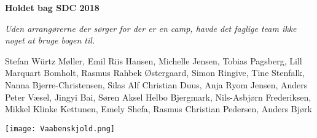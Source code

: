 \cleardoublepage
\begin{titlepage}
	\centering
	\vspace{3cm}
	{\Huge\sffamily\bfseries Holdet bag SDC 2018\par} \vspace{0.5cm}
	{\small\itshape Uden arrangørerne der sørger for der er en camp, havde det faglige team ikke noget at bruge bogen til.\par} \vspace{0.75cm}
	{Stefan Würtz Møller, Emil Riis Hansen, Michelle Jensen, Tobias Pagsberg, Lill Marquart Bomholt, Rasmus Rahbek Østergaard, Simon Ringive, Tine Stenfalk, Nanna Bjerre-Christensen, Silas Alf Christian Duus, Anja Ryom Jensen, Anders Peter Væsel, Jingyi Bai, Søren Aksel Helbo Bjergmark, Nils-Asbjørn Frederiksen, Mikkel Klinke Kettunen, Emely Shefa, Rasmus Christian Pedersen, Anders Bjørk \par} \vspace{0.75cm}
	\vfill
	{\centering
		\texttt{[image: Vaabenskjold.png]}\par}

\end{titlepage}